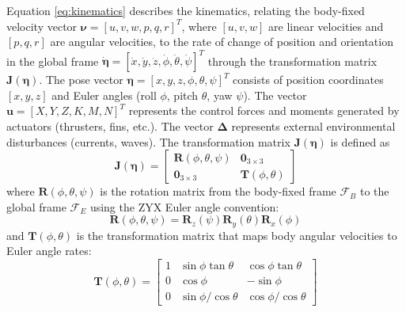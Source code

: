 Equation \eqref{eq:kinematics} describes the kinematics, relating the body-fixed velocity vector $\boldsymbol{\nu} = [u, v, w, p, q, r]^T$, where $[u, v, w]$ are linear velocities and $[p, q, r]$ are angular velocities, to the rate of change of position and orientation in the global frame $\dot{\boldsymbol{\eta}} = [\dot{x}, \dot{y}, \dot{z}, \dot{\phi}, \dot{\theta}, \dot{\psi}]^T$ through the transformation matrix $\mathbf{J}(\boldsymbol{\eta})$. The pose vector $\boldsymbol{\eta} = [x, y, z, \phi, \theta, \psi]^T$ consists of position coordinates $[x, y, z]$ and Euler angles (roll $\phi$, pitch $\theta$, yaw $\psi$). The vector $\mathbf{u} = [X, Y, Z, K, M, N]^T$ represents the control forces and moments generated by actuators (thrusters, fins, etc.). The vector $\boldsymbol{\Delta}$ represents external environmental disturbances (currents, waves). The transformation matrix $\mathbf{J}(\boldsymbol{\eta})$ is defined as
\begin{equation}
    \mathbf{J}(\boldsymbol{\eta}) =
    \begin{bmatrix}
        \mathbf{R}(\phi,\theta,\psi) & \mathbf{0}_{3\times3} \\
        \mathbf{0}_{3\times3} & \mathbf{T}(\phi,\theta)
    \end{bmatrix}
\end{equation}
where $\mathbf{R}(\phi,\theta,\psi)$ is the rotation matrix from the body-fixed frame $\mathcal{F}_B$ to the global frame $\mathcal{F}_E$ using the ZYX Euler angle convention:
\begin{equation}
    \mathbf{R}(\phi,\theta,\psi) = \mathbf{R}_z(\psi)\mathbf{R}_y(\theta)\mathbf{R}_x(\phi)
\end{equation}
and $\mathbf{T}(\phi,\theta)$ is the transformation matrix that maps body angular velocities to Euler angle rates:
\begin{equation}
    \mathbf{T}(\phi,\theta) =
    \begin{bmatrix}
        1 & \sin\phi \tan\theta & \cos\phi \tan\theta \\
        0 & \cos\phi & -\sin\phi \\
        0 & \sin\phi / \cos\theta & \cos\phi / \cos\theta
    \end{bmatrix}
\end{equation}


